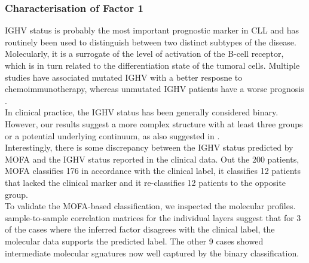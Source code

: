 \subsubsection{Characterisation of Factor 1}

IGHV status is probably the most important prognostic marker in CLL and has routinely been used to distinguish between two distinct subtypes of the disease. Molecularly, it is a surrogate of the level of activation of the B-cell receptor, which is in turn related to the differentiation state of the tumoral cells. Multiple studies have associated mutated IGHV with a better resposne to chemoimmunotherapy, whereas unmutated IGHV patients have a worse prognosis \cite{Fabbri2016,Bulian2017,Crombie2017,Damle1999}.\\

In clinical practice, the IGHV status has been generally considered binary. However, our results suggest a more complex structure with at least three groups or a potential underlying continuum, as also suggested in \cite{Oakes2016,Queiros2015}.\\
Interestingly, there is some discrepancy between the IGHV status predicted by MOFA and the IGHV status reported in the clinical data. Out the 200 patients, MOFA classifies 176 in accordance with the clinical label, it classifies 12 patients that lacked the clinical marker and it re-classifies 12 patients to the opposite group.\\
To validate the MOFA-based classification, we inspected the molecular profiles. sample-to-sample correlation matrices for the individual layers suggest that for 3 of the cases where the inferred factor disagrees with the clinical label, the molecular data supports the predicted label. The other 9 cases showed intermediate molecular sgnatures now well captured by the binary classification.\\


